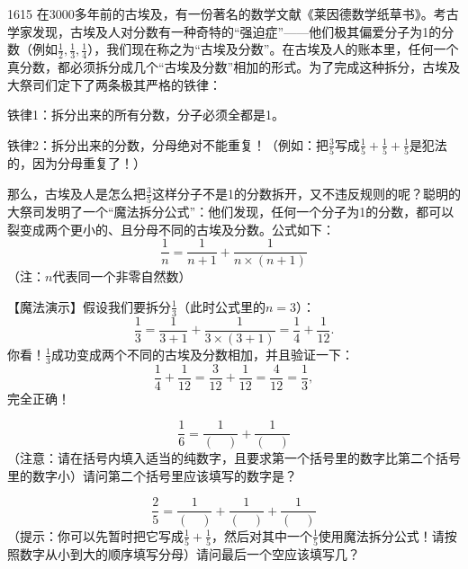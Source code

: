 \begin{question}{16}{15}
在3000多年前的古埃及，有一份著名的数学文献《莱因德数学纸草书》。考古学家发现，古埃及人对分数有一种奇特的“强迫症”——他们极其偏爱分子为1的分数（例如\(\frac12,\frac13,\frac14\)），我们现在称之为“古埃及分数”。在古埃及人的账本里，任何一个真分数，都必须拆分成几个“古埃及分数”相加的形式。为了完成这种拆分，古埃及大祭司们定下了两条极其严格的铁律：

铁律1：拆分出来的所有分数，分子必须全都是1。

铁律2：拆分出来的分数，分母绝对不能重复！（例如：把\(\frac35\)写成\(\frac15+\frac15+\frac15\)是犯法的，因为分母重复了！）

那么，古埃及人是怎么把\(\frac35\)这样分子不是1的分数拆开，又不违反规则的呢？聪明的大祭司发明了一个“魔法拆分公式”：他们发现，任何一个分子为1的分数，都可以裂变成两个更小的、且分母不同的古埃及分数。公式如下：
\[
  \frac1n=\frac1{n+1}+\frac1{n\times(n+1)}
\]
（注：\(n\)代表同一个非零自然数）

【魔法演示】假设我们要拆分\(\frac13\)（此时公式里的\(n=3\)）：
\[
  \frac13=\frac1{3+1}+\frac1{3\times(3+1)}
  =\frac14+\frac1{12}.
\]
你看！\(\frac13\)成功变成两个不同的古埃及分数相加，并且验证一下：
\[
  \frac14+\frac1{12}=\frac3{12}+\frac1{12}
  =\frac4{12}=\frac13,
\]
完全正确！

\begin{choices}
\end{choices}

\[
  \frac16=\frac1{(\quad)}+\frac1{(\quad)}
\]
（注意：请在括号内填入适当的纯数字，且要求第一个括号里的数字比第二个括号里的数字小）请问第二个括号里应该填写的数字是？
\answerspace

\[
  \frac25=\frac1{(\quad)}+\frac1{(\quad)}+\frac1{(\quad)}
\]
（提示：你可以先暂时把它写成\(\frac15+\frac15\)，然后对其中一个\(\frac15\)使用魔法拆分公式！请按照数字从小到大的顺序填写分母）请问最后一个空应该填写几？
\answerspace
\end{question}

